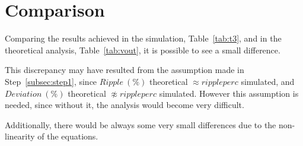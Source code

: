 \section{Comparison}
\label{sec:comparison}

Comparing the results achieved in the simulation, Table~\ref{tab:t3}, and in the theoretical
analysis, Table~\ref{tab:vout}, it is possible to see a small difference.

This discrepancy may have resulted from the assumption made in Step~\ref{subsec:step1},
since $Ripple\ (\%)$ theoretical $\approx rippleperc$ simulated, and
$Deviation\ (\%)$ theoretical $\not\approx rippleperc$ simulated. 
However this assumption is needed, since without it, the analysis would become very difficult.

Additionally, there would be always some very small differences due to the non-linearity of the equations.
